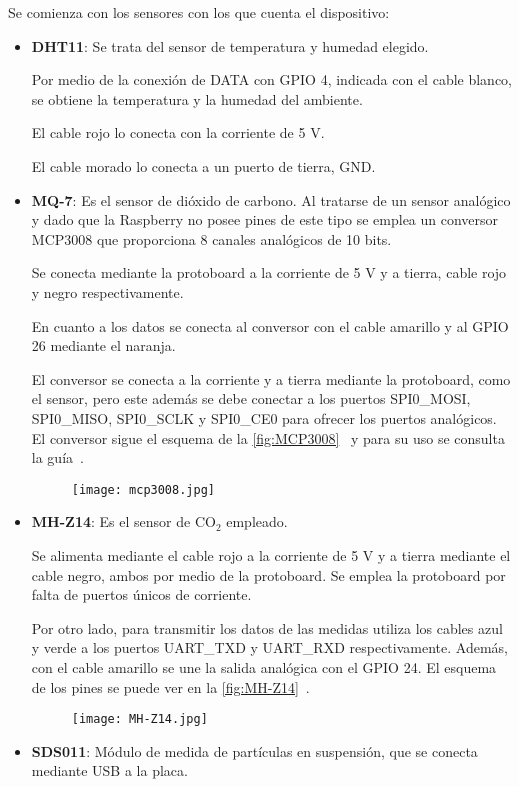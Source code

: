 Se comienza con los sensores con los que cuenta el dispositivo:
\begin{itemize}
	\item \textbf{DHT11}: Se trata del sensor de temperatura y humedad elegido.
	      
	      Por medio de la conexión de DATA con GPIO 4, indicada con el cable blanco, se obtiene la temperatura y la humedad del ambiente. 
	      
	      El cable rojo lo conecta con la corriente de 5 V\@.
	      
	      El cable morado lo conecta a un puerto de tierra, GND\@.
	\item \textbf{MQ-7}: Es el sensor de dióxido de carbono. Al tratarse de un sensor analógico y dado que la Raspberry no posee pines de este tipo se emplea un conversor MCP3008 que proporciona 8 canales analógicos de 10 bits.
	      
	      Se conecta mediante la protoboard a la corriente de 5 V y a tierra, cable rojo y negro respectivamente.
	      
	      En cuanto a los datos se conecta al conversor con el cable amarillo y al GPIO 26 mediante el naranja.
	      
	      El conversor se conecta a la corriente y a tierra mediante la protoboard, como el sensor, pero este además se debe conectar a los puertos SPI0\_MOSI, SPI0\_MISO, SPI0\_SCLK y SPI0\_CE0 para ofrecer los puertos analógicos. El conversor sigue el esquema de la \autoref{fig:MCP3008}~\cite{microchip_technology_inc_27v_2008} y para su uso se consulta la guía~\cite{dicola_raspberry_nodate}.
	      \begin{figure}[H]
		      {\texttt{[image: mcp3008.jpg]}}
	      \end{figure}
	\item \textbf{MH-Z14}: Es el sensor de CO$_2$ empleado.
	      
	      Se alimenta mediante el cable rojo a la corriente de 5 V y a tierra mediante el cable negro, ambos por medio de la protoboard. Se emplea la protoboard por falta de puertos únicos de corriente.
	      
	      Por otro lado, para transmitir los datos de las medidas utiliza los cables azul y verde a los puertos UART\_TXD y UART\_RXD respectivamente. Además, con el cable amarillo se une la salida analógica con el GPIO 24. El esquema de los pines se puede ver en la \autoref{fig:MH-Z14}~\cite{zhengzhou_winsen_electronics_technology_users_nodate}.
	      \begin{figure}[H]
		      {\texttt{[image: MH-Z14.jpg]}}
	      \end{figure}
	\item \textbf{SDS011}: Módulo de medida de partículas en suspensión, que se conecta mediante USB a la placa.
\end{itemize}

